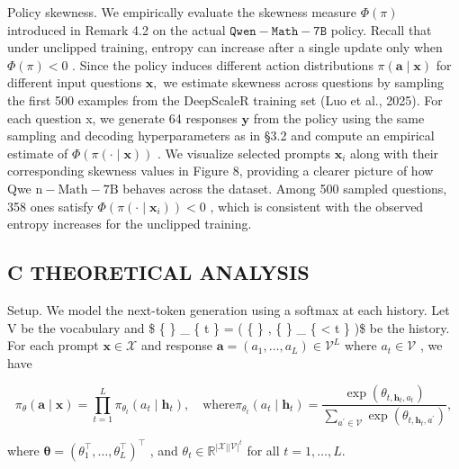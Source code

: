 \documentclass[
  10
]{article}
\begin{document}
Policy skewness. We empirically evaluate the skewness measure
\(\Phi ( \pi )\) introduced in Remark 4.2 on the actual
\(\mathtt { Q w e n - M a t h - 7 B }\) policy. Recall that under
unclipped training, entropy can increase after a single update only when
\(\Phi ( \pi ) < 0\) . Since the policy induces different action
distributions \(\pi ( { \boldsymbol { a } } \mid \mathbf { x } )\) for
different input questions \(\mathbf { x } ,\) we estimate skewness
across questions by sampling the first 500 examples from the DeepScaleR
training set (Luo et al., 2025). For each question x, we generate 64
responses \(\mathbf { y }\) from the policy using the same sampling and
decoding hyperparameters as in §3.2 and compute an empirical estimate of
\(\Phi ( \pi ( \cdot \mid \mathbf { x } ) )\) . We visualize selected
prompts \(\mathbf { x } _ { i }\) along with their corresponding
skewness values in Figure 8, providing a clearer picture of how Qwe
\(\mathrm { n - M a t h - 7 B }\) behaves across the dataset. Among 500
sampled questions, 358 ones satisfy
\(\Phi ( \pi ( \cdot \mid \mathbf { x } _ { i } ) ) < 0\) , which is
consistent with the observed entropy increases for the unclipped
training.

\subsection{C THEORETICAL ANALYSIS}\label{c-theoretical-analysis}

Setup. We model the next-token generation using a softmax at each
history. Let V be the vocabulary and \$ \{  \} \_ \{ t \} =
( \{  \} , \{  \} \_ \{ \textless{} t \} )\$
be the history. For each prompt \(\mathbf x \in \mathcal X\) and
response
\(\mathbf { a } = ( a _ { 1 } , \dots , a _ { L } ) \in \mathcal { V } ^ { L }\)
where \(a _ { t } \in \mathcal V\) , we have

\[
\pi_ {\theta} (\mathbf {a} \mid \mathbf {x}) = \prod_ {t = 1} ^ {L} \pi_ {\theta_ {t}} (a _ {t} \mid \mathbf {h} _ {t}), \quad \text {where} \pi_ {\theta_ {t}} (a _ {t} \mid \mathbf {h} _ {t}) = \frac {\exp (\theta_ {t , \mathbf {h} _ {t} , a _ {t}})}{\sum_ {a ^ {\prime} \in \mathcal {V}} \exp (\theta_ {t , \mathbf {h} _ {t} , a ^ {\prime}})},
\]

where
\(\boldsymbol { \theta } = ( \theta _ { 1 } ^ { \top } , \ldots , \theta _ { L } ^ { \top } ) ^ { \top }\)
, and
\(\theta _ { t } \in \mathbb { R } ^ { | \mathcal { X } | | \mathcal { V } | ^ { t } }\)
for all \(t = 1 , \ldots , L .\)
\end{document}
